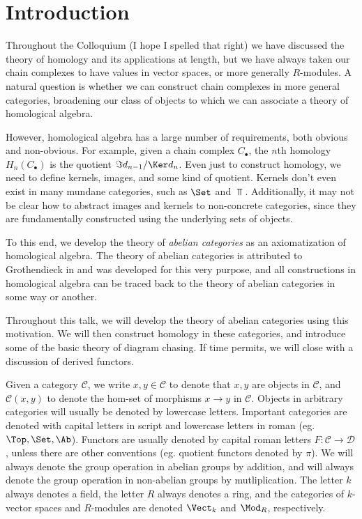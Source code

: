 \section{Introduction}\label{sec1}

Throughout the Colloquium (I hope I spelled that right) we have discussed the theory of homology and its applications at length, but we have always taken our chain complexes to have values in vector spaces, or more generally $R$-modules. A natural question is whether we can construct chain complexes in more general categories, broadening our class of objects to which we can associate a theory of homological algebra.

However, homological algebra has a large number of requirements, both obvious and non-obvious. For example, given a chain complex $C_{\bullet} $, the $n$th homology $H_n(C_{\bullet} )$ is the quotient $\Im d_{n-1} / \Ker d_{n} $. Even just to construct homology, we need to define kernels, images, and some kind of quotient. Kernels don't even exist in many mundane categories, such as $\Set $ and $\Top $. Additionally, it may not be clear how to abstract images and kernels to non-concrete categories, since they are fundamentally constructed using the underlying sets of objects.

To this end, we develop the theory of \emph{abelian categories} as an axiomatization of homological algebra. The theory of abelian categories is attributed to Grothendieck in \cite{groth} and was developed for this very purpose, and all constructions in homological algebra can be traced back to the theory of abelian categories in some way or another.

Throughout this talk, we will develop the theory of abelian categories using this motivation. We will then construct homology in these categories, and introduce some of the basic theory of diagram chasing. If time permits, we will close with a discussion of derived functors.

\begin{convention}\label{1.1}
	Given a category $\mathcal{C} $, we write $x,y\in \mathcal{C} $ to denote that $x,y$ are objects in $\mathcal{C} $, and $\mathcal{C} (x,y)$ to denote the hom-set of morphisms $x\to y$ in $\mathcal{C} $. Objects in arbitrary categories will usually be denoted by lowercase letters. Important categories are denoted with capital letters in script and lowercase letters in roman (eg. $\Top ,\Set ,\Ab $). Functors are usually denoted by capital roman letters $F : \mathcal{C}  \to \mathcal{D} $, unless there are other conventions (eg. quotient functors denoted by $\pi $). We will always denote the group operation in abelian groups by addition, and will always denote the group operation in non-abelian groups by mutliplication. The letter $k$ always denotes a field, the letter $R$ always denotes a ring, and the categories of $k$-vector spaces and $R$-modules are denoted $\Vect_{k} $ and $\Mod_R$, respectively.
\end{convention}


